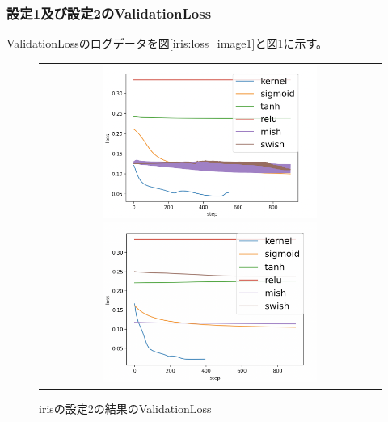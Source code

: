 \subsubsection{設定1及び設定2のValidationLoss}
\label{iris:loss}


ValidationLossのログデータを図\ref{iris:loss_image1}と図\ref{iris:loss_image2}に示す。

\begin{figure}[hbtp]
    \begin{center}
        \begin{tabular}{c}
            \begin{minipage}{0.5\hsize}
                \includegraphics[clip, width=7cm]{asset/iris_0.1_1000_3_02_sgd_non_kaiming_uniform.png}
                    \caption{irisの設定1の結果のValidationLoss}
                    \label{iris:loss_image1}
            \end{minipage}
            \hspace{10pt}
            \begin{minipage}{0.5\hsize}
                \includegraphics[clip, width=7cm]{asset/iris_0.1_1000_3_02_sgd_l2_kaiming_uniform.png}
                    \caption{irisの設定2の結果のValidationLoss}
                    \label{iris:loss_image2}
            \end{minipage}
        \end{tabular}
    \end{center}
\end{figure}


